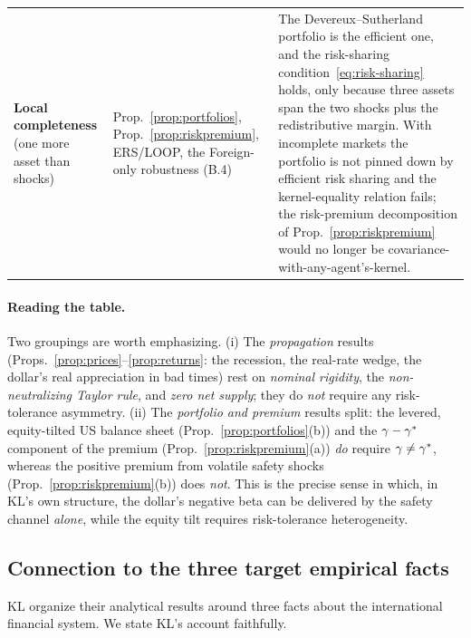 \begin{longtable}{p{} p{} p{}}
\textbf{Local completeness} (one more asset than shocks)
& Prop.~\ref{prop:portfolios}, Prop.~\ref{prop:riskpremium}, ERS/LOOP, the
Foreign-only robustness (B.4)
& The Devereux--Sutherland portfolio is the efficient one, and the risk-sharing
condition~\eqref{eq:risk-sharing} holds, only because three assets span the two
shocks plus the redistributive margin. With incomplete markets the portfolio is
not pinned down by efficient risk sharing and the kernel-equality relation fails;
the risk-premium decomposition of Prop.~\ref{prop:riskpremium} would no longer be
covariance-with-any-agent's-kernel.\\

\end{longtable}

\paragraph{Reading the table.} Two groupings are worth emphasizing. (i) The
\emph{propagation} results (Props.~\ref{prop:prices}--\ref{prop:returns}: the
recession, the real-rate wedge, the dollar's real appreciation in bad times) rest
on \emph{nominal rigidity}, the \emph{non-neutralizing Taylor rule}, and \emph{zero
net supply}; they do \emph{not} require any risk-tolerance asymmetry. (ii) The
\emph{portfolio and premium} results split: the levered, equity-tilted US balance
sheet (Prop.~\ref{prop:portfolios}(b)) and the $\gamma-\gamma^{*}$ component of the
premium (Prop.~\ref{prop:riskpremium}(a)) \emph{do} require $\gamma\neq\gamma^{*}$,
whereas the positive premium from volatile safety shocks
(Prop.~\ref{prop:riskpremium}(b)) does \emph{not}. This is the precise sense in
which, in KL's own structure, the dollar's negative beta can be delivered by the
safety channel \emph{alone}, while the equity tilt requires risk-tolerance
heterogeneity.

\subsection{Connection to the three target empirical facts}
\label{sec:empirical-facts}

KL organize their analytical results around three facts about the international
financial system. We state KL's account faithfully.

